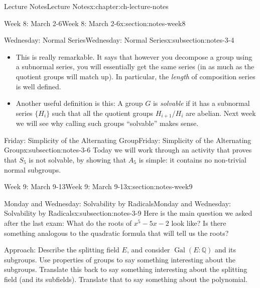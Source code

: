 \documentclass[oneside,11pt,]{book}
\begin{document}
\begin{chapterptx}{Lecture Notes}{}{Lecture Notes}{}{}{x:chapter:ch-lecture-notes}
\begin{sectionptx}{Week 8: March 2-6}{}{Week 8: March 2-6}{}{}{x:section:notes-week8}
\begin{subsectionptx}{Wednesday: Normal Series}{}{Wednesday: Normal Series}{}{}{x:subsection:notes-3-4}
\begin{itemize}[label=\textbullet]
\item{}This is really remarkable. It says that however you decompose a group using a subnormal series, you will essentially get the same series (in as much as the quotient groups will match up). In particular, the \emph{length} of composition series is well defined.%
\item{}Another useful definition is this: A group \(G\) is \emph{solvable} if it has a subnormal series \(\{H_i\}\) such that all the quotient groups \(H_{i+1}/H_{i}\) are abelian. Next week we will see why calling such groups ``solvable'' makes sense.%
\end{itemize}
%
\end{subsectionptx}
%
%
\typeout{************************************************}
\typeout{************************************************}
%
\begin{subsectionptx}{Friday: Simplicity of the Alternating Group}{}{Friday: Simplicity of the Alternating Group}{}{}{x:subsection:notes-3-6}
Today we will work through an activity that proves that \(S_5\) is not solvable, by showing that \(A_5\) is simple: it contains no non-trivial normal subgroups.%
\end{subsectionptx}
\end{sectionptx}
%
%
\typeout{************************************************}
\typeout{************************************************}
%
\begin{sectionptx}{Week 9: March 9-13}{}{Week 9: March 9-13}{}{}{x:section:notes-week9}
%
%
\typeout{************************************************}
\typeout{************************************************}
%
\begin{subsectionptx}{Monday and Wednesday: Solvability by Radicals}{}{Monday and Wednesday: Solvability by Radicals}{}{}{x:subsection:notes-3-9}
Here is the main question we asked after the last exam: What do the roots of \(x^5 - 5x - 2\) look like? Is there something analogous to the quadratic formula that will tell us the roots?%
\par
Approach: Describe the splitting field \(E\), and consider \(\mathop{\mathrm{Gal}}(E:\mathbb Q)\) and its subgroups. Use properties of groups to say something interesting about the subgroups. Translate this back to say something interesting about the splitting field (and its subfields). Translate that to say something about the polynomial.%

\end{subsectionptx}
\end{sectionptx}
\end{chapterptx}
\end{document}
